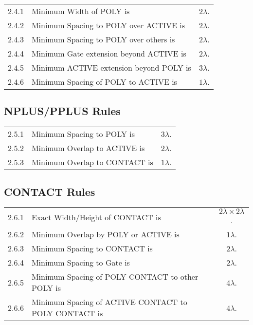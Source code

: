 \begin{flushleft}
    \begin{tabular}{c l c}
        2.4.1   & Minimum Width of POLY is & $2 \lambda$. \\
        2.4.2   & Minimum Spacing to POLY over ACTIVE is & $2 \lambda$. \\
        2.4.3   & Minimum Spacing to POLY over others is & $2 \lambda$. \\
        2.4.4   & Minimum Gate extension beyond ACTIVE is & $2 \lambda$. \\
        2.4.5   & Minimum ACTIVE extension beyond POLY is & $3 \lambda$. \\
        2.4.6   & Minimum Spacing of POLY to ACTIVE is & $1 \lambda$. \\
    \end{tabular}
\end{flushleft}

\subsection{NPLUS/PPLUS Rules}\label{design_rules_plus_rules}

\begin{flushleft}
    \begin{tabular}{c l c}
        2.5.1   & Minimum Spacing to POLY is & $3 \lambda$. \\
        2.5.2   & Minimum Overlap to ACTIVE is & $2 \lambda$. \\
        2.5.3   & Minimum Overlap to CONTACT is & $1 \lambda$. \\
    \end{tabular}
\end{flushleft}

\subsection{CONTACT Rules}\label{design_rules_contact_rules}

\begin{flushleft}
    \begin{tabular}{c l c}
        2.6.1   & Exact Width/Height of CONTACT is & $ 2 \lambda \times 2 \lambda$. \\
        2.6.2   & Minimum Overlap by POLY or ACTIVE is & $1 \lambda$. \\
        2.6.3   & Minimum Spacing to CONTACT is & $2 \lambda$. \\
        2.6.4   & Minimum Spacing to Gate is & $2 \lambda$. \\
        2.6.5   & Minimum Spacing of POLY CONTACT to other POLY is & $4 \lambda$. \\
        2.6.6   & Minimum Spacing of ACTIVE CONTACT to POLY CONTACT is & $4 \lambda$. \\
    \end{tabular}
\end{flushleft}

